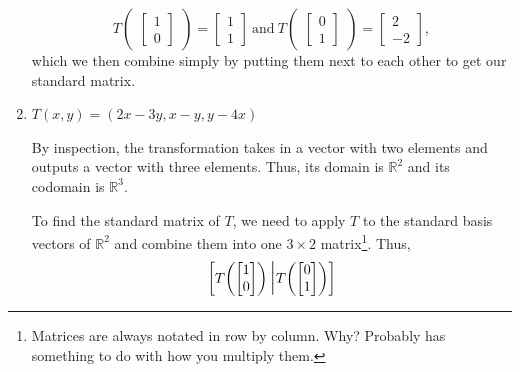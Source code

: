 \documentclass{article}
\begin{document}
\begin{enumerate}
{\begin{minipage}{.76\textwidth}
\[            T\!\begin{pmatrix}
                \begin{bmatrix}
                    1\\0
                \end{bmatrix}
            \end{pmatrix} = \begin{bmatrix}
                1\\1
            \end{bmatrix}~\text{and}~T\!\begin{pmatrix}
                \begin{bmatrix}
                    0\\1
                \end{bmatrix}
            \end{pmatrix} = \begin{bmatrix}
                2\\-2
            \end{bmatrix},
        \]which we then combine simply by putting them next to each other to get our standard matrix. 
    \end{minipage}%
    }
    \item \(T(x,y) = (2x-3y,x-y,y-4x)\)\begin{solution}
        By inspection, the transformation takes in a vector with two elements and outputs a vector with three elements. Thus, its domain is \(\mathbb{R}^2\) and its codomain is \(\mathbb{R}^3\).\par 
        To find the standard matrix of \(T\), we need to apply \(T\) to the standard basis vectors of \(\mathbb{R}^2\) and combine them into one \(3 \times 2\) matrix\footnote{Matrices are always notated in row by column. Why? Probably has something 
        to do with how you multiply them.}. Thus,\[
            \begin{bmatrix}
                T\!\begin{pmatrix}
                    \begin{bmatrix}
                        1\\0
                    \end{bmatrix}
                \end{pmatrix}\scalebox{1.3}{\Big|}T\!\begin{pmatrix}
                    \begin{bmatrix}
                        0\\1
                    \end{bmatrix}

\end{pmatrix}
\end{bmatrix}\]
\end{solution}
\end{enumerate}
\end{document}
